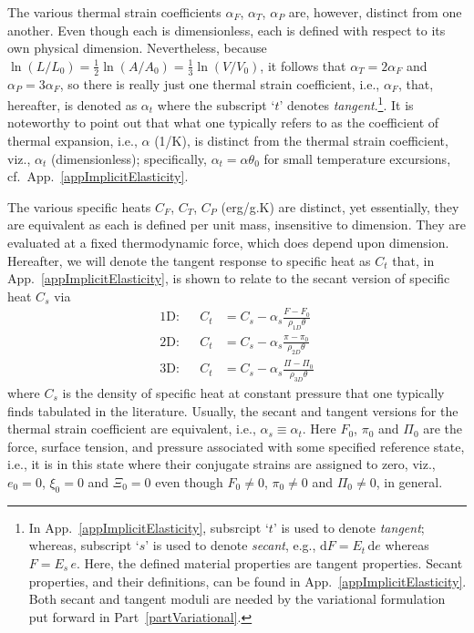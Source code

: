 The various thermal strain coefficients $\alpha_F$, $\alpha_T$, $\alpha_P$ are, however, distinct from one another.  Even though each is dimensionless, each is defined with respect to its own physical dimension.  Nevertheless, because $\ln(L / L_0) = \tfrac{1}{2} \ln (A / \! A_0) = \tfrac{1}{3} \ln (V \! / V_0)$, it follows that $\alpha_T = 2 \alpha_F$ and $\alpha_P = 3 \alpha_F$, so there is really just one thermal strain coefficient, i.e., $\alpha_F$, that, hereafter, is denoted as $\alpha_t$ where the subscript `$t$' denotes \textit{tangent}.\footnote{
    In App.~\ref{appImplicitElasticity}, subsrcipt `$t$' is used to denote \textit{tangent\/}; whereas, subscript `$s$' is used to denote \textit{secant}, e.g., $\mathrm{d}F = E_t \, \mathrm{d} e$ whereas $F = E_s \, e$.  Here, the defined material properties are tangent properties.  Secant properties, and their definitions, can be found in App.~\ref{appImplicitElasticity}.  Both secant and tangent moduli are needed by the variational formulation put forward in Part~\ref{partVariational}.
}.  
It is noteworthy to point out that what one typically refers to as the coefficient of thermal expansion, i.e., $\alpha$ (1/K), is distinct from the thermal strain coefficient, viz., $\alpha_t$ (dimensionless); specifically, $\alpha_t = \alpha \theta_0$ for small temperature excursions, cf.\ App.~\ref{appImplicitElasticity}.

The various specific heats $C_F$, $C_T$, $C_P$ (erg/g.K) are distinct, yet essentially, they are equivalent as each is defined per unit mass, insensitive to dimension.  They are evaluated at a fixed thermo\-dynamic force, which does depend upon dimension.  Hereafter, we will denote the tangent response to specific heat as $C_t$ that, in App.~\ref{appImplicitElasticity}, is shown to relate to the secant version of specific heat $C_s$ via
\begin{subequations}
    \label{specificHeats}
    \begin{align}
    \text{1D:} & &
    C_t & = C_s - \alpha_s \frac{F - F_0}{\rho_{1D} \theta} \\ 
    \text{2D:} & &
    C_t & = C_s - \alpha_s \frac{\pi - \pi_0}{\rho_{2D} \theta} \\
    \text{3D:} & &
    C_t & = C_s - \alpha_s \frac{\Pi - \Pi_0}{\rho_{3D} \theta}
    \end{align}
\end{subequations}
where $C_s$ is the density of specific heat at constant pressure that one typically finds tabulated in the literature. Usually, the secant and tangent versions for the thermal strain coefficient are equivalent, i.e., $\alpha_s \equiv \alpha_t$.  Here $F_0$, $\pi_0$ and $\Pi_0$ are the force, surface tension, and pressure associated with some specified reference state, i.e., it is in this state where their conjugate strains are assigned to zero, viz., $e_0 = 0$, $\xi_0 = 0$ and $\Xi_0 = 0$ even though $F_0 \neq 0$, $\pi_0 \neq 0$ and $\Pi_0 \neq 0$, in general.

